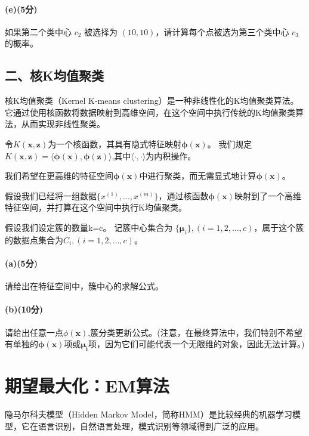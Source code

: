 \documentclass[12pt,a4paper]{article}%
\begin{document}
\paragraph*{(e)(5分)}如果第二个类中心 $c_2$ 被选择为 $(10,10)$，请计算每个点被选为第三个类中心 $c_3$ 的概率。

\subsection*{二、核K均值聚类}
核K均值聚类（Kernel K-means clustering）是一种非线性化的K均值聚类算法。它通过使用核函数将数据映射到高维空间，在这个空间中执行传统的K均值聚类算法，从而实现非线性聚类。

令$K(\boldsymbol{x},\boldsymbol{z})$为一个核函数，其具有隐式特征映射$\boldsymbol{\phi(\textbf{x})}$。
我们规定$K(\boldsymbol{x},\boldsymbol{z})=\langle \boldsymbol{\phi(\textbf{x})},\boldsymbol{\phi(\textbf{z})}\rangle $,其中$\langle \cdot,\cdot\rangle $为内积操作。

我们希望在更高维的特征空间$\boldsymbol{\phi(\textbf{x})}$中进行聚类，而无需显式地计算$\boldsymbol{\phi(\textbf{x})}$。

假设我们已经将一组数据$\{x^{(1)}, . . . , x^{(m)}\}$，通过核函数$\boldsymbol{\phi(\textbf{x})}$映射到了一个高维特征空间，并打算在这个空间中执行K均值聚类。

假设我们设定簇的数量k=c。%
记簇中心集合为
$\{\mathbf{\mu}_i\},(i=1,2,\dots,c)$，属于这个簇的数据点集合为$C_i,(i=1,2,\dots,c)$。

\paragraph*{(a)(5分)}请给出在特征空间中，簇中心的求解公式。

\paragraph*{(b)(10分)}请给出任意一点$\phi(\textbf{x})$,簇分类更新公式。(注意，在最终算法中，我们特别不希望有单独的$\boldsymbol{\phi(\textbf{x})}$项或$\boldsymbol{\mu_i}$项，因为它们可能代表一个无限维的对象，因此无法计算。)

\section{期望最大化：EM算法}
隐马尔科夫模型（Hidden Markov Model，简称HMM）是比较经典的机器学习模型，它在语言识别，自然语言处理，模式识别等领域得到广泛的应用。
\end{document}
